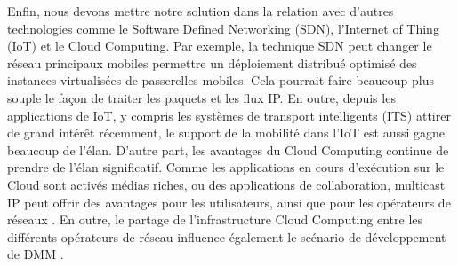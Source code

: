 Enfin, nous devons mettre notre solution dans la relation avec d'autres technologies comme le Software Defined Networking (SDN), l'Internet of Thing (IoT) et le Cloud Computing. Par exemple, la technique SDN peut changer le réseau principaux mobiles permettre un déploiement distribué optimisé des instances virtualisées de passerelles mobiles. Cela pourrait faire beaucoup plus souple le façon de traiter les paquets et les flux IP. En outre, depuis les applications de IoT, y compris les systèmes de transport intelligents (ITS) attirer de grand intérêt récemment, le support de la mobilité dans l'IoT est aussi gagne beaucoup de l'élan. D'autre part, les avantages du Cloud Computing continue de prendre de l'élan significatif. Comme les applications en cours d'exécution sur le Cloud ​​sont activés médias riches, ou des applications de collaboration, multicast IP peut offrir des avantages pour les utilisateurs, ainsi que pour les opérateurs de réseaux \cite{cloud_multicast}. En outre, le partage de l'infrastructure Cloud Computing entre les différents opérateurs de réseau influence également le scénario de développement de DMM \cite{cloud_dmm}.
